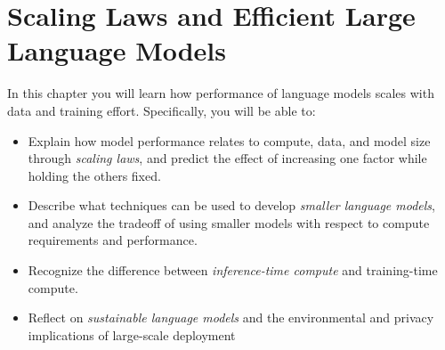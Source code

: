 \chapter[Scaling Laws and Efficiency]{Scaling Laws and Efficient Large Language Models}\label{chap:scaling}

\begin{learningbox}
In this chapter you will learn how  performance of language models scales with data and training effort.
Specifically, you will be able to:
\begin{itemize}[leftmargin=*, nosep]
    \item Explain how model performance relates to compute, data, and model size through {\em scaling laws}, and predict the effect of increasing one factor while holding the others fixed.
    \item Describe what techniques can be used to develop {\em smaller language models}, and analyze the tradeoff of using smaller models with respect to compute requirements and performance. 
    \item Recognize the difference between {\em inference-time compute} and training-time compute.
    \item Reflect on \emph{sustainable language models} and the environmental and privacy implications of large-scale deployment 
\end{itemize}
\end{learningbox}

